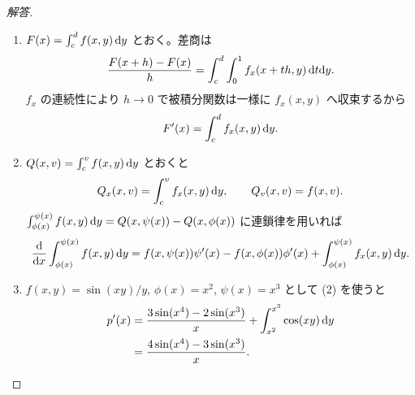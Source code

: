 \begin{proof}[解答]
\begin{enumerate}
  \item[(1)] $F(x)=\int_c^d f(x,y)\,\mathrm{d} y$ とおく。差商は
  \[
  \frac{F(x+h)-F(x)}h
  =\int_c^d\int_0^1 f_x(x+th,y)\,\mathrm{d} t\mathrm{d} y.
  \]
  $f_x$ の連続性により $h\to0$ で被積分関数は一様に $f_x(x,y)$ へ収束するから
  \[
  F'(x)=\int_c^d f_x(x,y)\,\mathrm{d} y.
  \]

  \item[(2)] $Q(x,v)=\int_c^v f(x,y)\,\mathrm{d} y$ とおくと
  \[
  Q_x(x,v)=\int_c^v f_x(x,y)\,\mathrm{d} y,\qquad Q_v(x,v)=f(x,v).
  \]
  $\int_{\phi(x)}^{\psi(x)}f(x,y)\,\mathrm{d} y
  =Q(x,\psi(x))-Q(x,\phi(x))$ に連鎖律を用いれば
  \[
  \frac{\mathrm{d}}{\mathrm{d} x}\int_{\phi(x)}^{\psi(x)}f(x,y)\,\mathrm{d} y
  =f(x,\psi(x))\psi'(x)-f(x,\phi(x))\phi'(x)
  +\int_{\phi(x)}^{\psi(x)}f_x(x,y)\,\mathrm{d} y.
  \]

  \item[(3)] $f(x,y)=\sin(xy)/y$, $\phi(x)=x^2$, $\psi(x)=x^3$ として (2) を使うと
  \begin{align*}
  p'(x)
  &=\frac{3\sin(x^4)-2\sin(x^3)}x
    +\int_{x^2}^{x^3}\cos(xy)\,\mathrm{d} y\\
  &=\frac{4\sin(x^4)-3\sin(x^3)}x.
  \end{align*}
\end{enumerate}
\end{proof}

